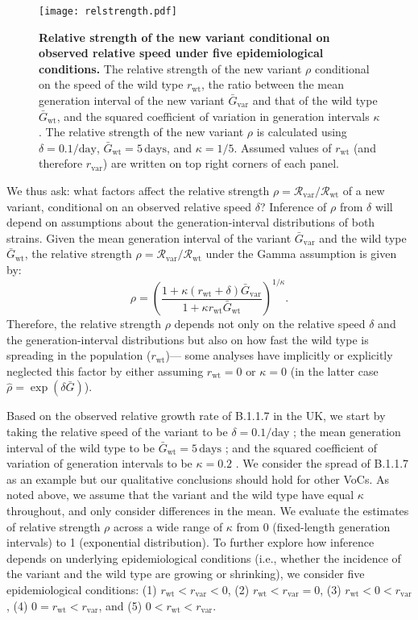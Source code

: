 \documentclass[12pt]{article}
\newcommand{\vvvar}{\mathrm{var}}
\newcommand{\wwwt}{\mathrm{wt}}
\newcommand{\rx}[1]{\ensuremath{{r}_{#1}}\xspace}
\newcommand{\rw}{\rx{\wwwt}}
\newcommand{\rv}{\rx{\vvvar}}
\newcommand{\Rx}[1]{\ensuremath{{\mathcal R}_{#1}}\xspace}
\newcommand{\Rw}{\Rx{\wwwt}}
\newcommand{\Rv}{\Rx{\vvvar}}
\newcommand{\days}{\ensuremath{\, \textrm{days}}}
\newcommand{\pday}{\ensuremath{/\textrm{day}}}
\newcommand{\Gx}[1]{\ensuremath{{\bar G}_{#1}}\xspace}
\newcommand{\Gw}{\Gx{\wwwt}}
\newcommand{\Gv}{\Gx{\vvvar}}
\begin{document}
\begin{figure}[!t]
\texttt{[image: relstrength.pdf]}
\caption{
\textbf{Relative strength of the new variant conditional on observed relative speed under five epidemiological conditions.}
The relative strength of the new variant $\rho$ conditional on the speed of the wild type $\rw$, the ratio between the mean generation interval of the new variant $\Gv$ and that of the wild type $\Gw$, and the squared coefficient of variation in generation intervals $\kappa$.
The relative strength of the new variant $\rho$ is calculated using $\delta=0.1\pday$, $\Gw = 5\days$, and $\kappa = 1/5$.
Assumed values of $\rw$ (and therefore $\rv$) are written on top right corners of each panel.
}
\label{fig:relstrength}
\end{figure}

We thus ask: what factors affect the relative strength $\rho = \Rv/\Rw$ of a new variant, conditional on an observed relative speed $\delta$?
Inference of $\rho$ from $\delta$ will depend on assumptions about the generation-interval distributions of both strains.
Given the mean generation interval of the variant $\Gv$ and the wild type $\Gw$, the relative strength $\rho = \Rv/\Rw$ under the Gamma assumption \citep{park2019practical} is given by:
\begin{equation}
\rho = \left(\frac{1 + \kappa (\rw + \delta) \Gv}{1 + \kappa \rw \Gw}\right)^{1/\kappa}.
\end{equation}
Therefore, the relative strength $\rho$ depends not only on the relative speed $\delta$ and the generation-interval distributions but also on how fast the wild type is spreading in the population (\rw)---
some analyses have implicitly or explicitly neglected this factor by either assuming $\rw = 0$ \citep{switzerland2021variant} or $\kappa = 0$ \citep{davies2021estimated} (in the latter case $\hat{\rho} = \exp(\delta \bar{G})$).

Based on the observed relative growth rate of B.1.1.7 in the UK, we start by  taking the relative speed of the variant to be $\delta = 0.1\pday$  \citep{davies2021estimated}; the mean generation interval of the wild type to be $\Gw = 5\days$ \citep{ferretti2020quantifying}; and the squared coefficient of variation of generation intervals to be $\kappa=0.2$ \citep{ferretti2020quantifying}.
We consider the spread of B.1.1.7 as an example but our qualitative conclusions should hold for other VoCs.
As noted above, we assume that the variant and the wild type have equal $\kappa$ throughout, and only consider differences in the mean.
We evaluate the estimates of relative strength $\rho$ across a wide range of $\kappa$ from 0 (fixed-length generation intervals) to 1 (exponential distribution).
To further explore how inference depends on underlying epidemiological conditions (i.e., whether the incidence of the variant and the wild type are growing or shrinking), we consider five epidemiological conditions: (1) $\rw < \rv < 0$, (2) $\rw < \rv = 0$, (3) $\rw < 0 < \rv$, (4) $0 = \rw < \rv$, and (5) $0 < \rw < \rv$.
\end{document}
